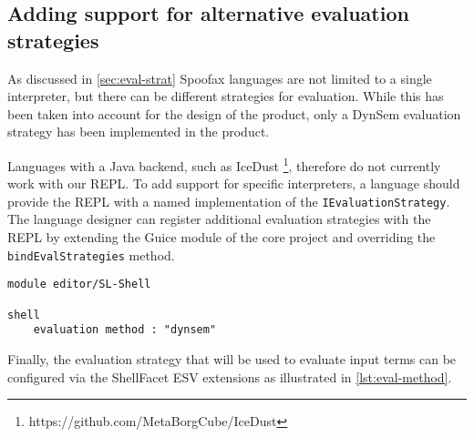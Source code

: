 \subsection{Adding support for alternative evaluation strategies}
\label{sec:discuss-alternate-eval}

As discussed in \cref{sec:eval-strat} Spoofax languages are not limited to a
single interpreter, but there can be different strategies for evaluation.
While this has been taken into account for the design of the product, only
a DynSem evaluation strategy has been implemented in the product.

Languages with a Java backend, such as IceDust%
\footnote{https://github.com/MetaBorgCube/IceDust}, therefore do not currently
work with our REPL. To add support for specific interpreters, a language should
provide the REPL with a named implementation of the
\texttt{IEvaluationStrategy}. The language designer can register additional
evaluation strategies with the REPL by extending the Guice module of the core
project and overriding the \texttt{bindEvalStrategies} method.

\begin{lstlisting}[language=esv,caption={Setting the evaluation strategy},label={lst:eval-method}]
module editor/SL-Shell

shell
    evaluation method : "dynsem"
\end{lstlisting}

Finally, the evaluation strategy that will be used to evaluate input terms
can be configured via the ShellFacet ESV extensions as illustrated in \cref{lst:eval-method}.
